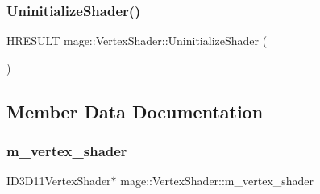 \subsubsection{\texorpdfstring{Uninitialize\+Shader()}{UninitializeShader()}}
{\footnotesize\ttfamily H\+R\+E\+S\+U\+LT mage\+::\+Vertex\+Shader\+::\+Uninitialize\+Shader (\begin{DoxyParamCaption}{ }\end{DoxyParamCaption})\hspace{0.3cm}{\ttfamily [protected]}}



\subsection{Member Data Documentation}
\hypertarget{classmage_1_1_vertex_shader_a1f08ea7d1ebbeb2aba71684f916fc83b}{}\label{classmage_1_1_vertex_shader_a1f08ea7d1ebbeb2aba71684f916fc83b} 
\subsubsection{\texorpdfstring{m\+\_\+vertex\+\_\+shader}{m\_vertex\_shader}}
{\footnotesize\ttfamily I\+D3\+D11\+Vertex\+Shader$\ast$ mage\+::\+Vertex\+Shader\+::m\+\_\+vertex\+\_\+shader\hspace{0.3cm}{\ttfamily [protected]}}

